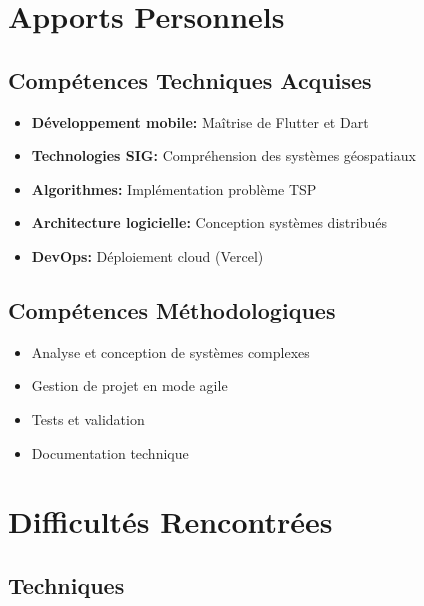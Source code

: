 \documentclass[12pt,a4paper]{report}
\begin{document}
\section{Apports Personnels}

\subsection{Compétences Techniques Acquises}

\begin{itemize}
    \item \textbf{Développement mobile:} Maîtrise de Flutter et Dart
    \item \textbf{Technologies SIG:} Compréhension des systèmes géospatiaux
    \item \textbf{Algorithmes:} Implémentation problème TSP
    \item \textbf{Architecture logicielle:} Conception systèmes distribués
    \item \textbf{DevOps:} Déploiement cloud (Vercel)
\end{itemize}

\subsection{Compétences Méthodologiques}

\begin{itemize}
    \item Analyse et conception de systèmes complexes
    \item Gestion de projet en mode agile
    \item Tests et validation
    \item Documentation technique
\end{itemize}

\section{Difficultés Rencontrées}

\subsection{Techniques}
\end{document}
